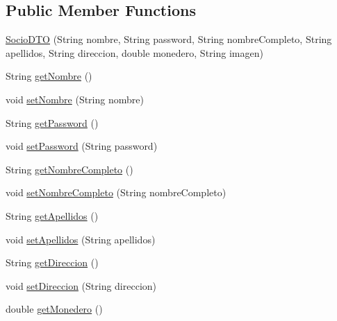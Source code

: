 \subsection*{Public Member Functions}
\begin{DoxyCompactItemize}
\item 
\mbox{\hyperlink{classes_1_1deusto_1_1server_1_1dto_1_1_socio_d_t_o_a5020ced46cab38213721841e56d9f38f}{Socio\+D\+TO}} (String nombre, String password, String nombre\+Completo, String apellidos, String direccion, double monedero, String imagen)
\item 
String \mbox{\hyperlink{classes_1_1deusto_1_1server_1_1dto_1_1_socio_d_t_o_a25f4d6df847f79812fd20c4831871185}{get\+Nombre}} ()
\item 
void \mbox{\hyperlink{classes_1_1deusto_1_1server_1_1dto_1_1_socio_d_t_o_aab44998d8490c38239063ea51b66ce52}{set\+Nombre}} (String nombre)
\item 
String \mbox{\hyperlink{classes_1_1deusto_1_1server_1_1dto_1_1_socio_d_t_o_a3cc193371db470083d9ddd673802d20f}{get\+Password}} ()
\item 
void \mbox{\hyperlink{classes_1_1deusto_1_1server_1_1dto_1_1_socio_d_t_o_af2afe199fc47d9e2da33121892600e21}{set\+Password}} (String password)
\item 
String \mbox{\hyperlink{classes_1_1deusto_1_1server_1_1dto_1_1_socio_d_t_o_a75e8d9cacff9951035e80a3467b564c8}{get\+Nombre\+Completo}} ()
\item 
void \mbox{\hyperlink{classes_1_1deusto_1_1server_1_1dto_1_1_socio_d_t_o_afb76400b33aeb967356abcd694559a7a}{set\+Nombre\+Completo}} (String nombre\+Completo)
\item 
String \mbox{\hyperlink{classes_1_1deusto_1_1server_1_1dto_1_1_socio_d_t_o_aa5539e179d8333ac5c239c2e6c86a9df}{get\+Apellidos}} ()
\item 
void \mbox{\hyperlink{classes_1_1deusto_1_1server_1_1dto_1_1_socio_d_t_o_a16eb1e1b2b02afa38b38506b818a8786}{set\+Apellidos}} (String apellidos)
\item 
String \mbox{\hyperlink{classes_1_1deusto_1_1server_1_1dto_1_1_socio_d_t_o_aecd5084a3104808141cf0e3f2bd71262}{get\+Direccion}} ()
\item 
void \mbox{\hyperlink{classes_1_1deusto_1_1server_1_1dto_1_1_socio_d_t_o_a4c58785ebde0304cffe32dfbab8f6a75}{set\+Direccion}} (String direccion)
\item 
double \mbox{\hyperlink{classes_1_1deusto_1_1server_1_1dto_1_1_socio_d_t_o_ac7fb724e7d2c4f2322ef53de75b79234}{get\+Monedero}} ()
\item 

\end{DoxyCompactItemize}
